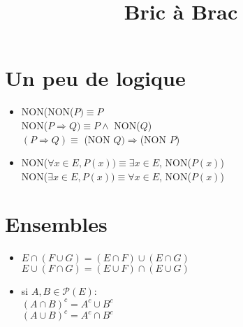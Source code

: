 \documentclass[fleqn]{article}
\title{Bric \`a Brac}
\date{}
\begin{document}
\maketitle

\section{Un peu de logique}
\begin{itemize}
	\item NON(NON(\(P) \equiv  P\) \\
		NON(\(P \Rightarrow Q) \equiv P \land\) NON(\(Q\)) \\
		\((P \Rightarrow Q) \equiv\) (NON \(Q)\Rightarrow\)(NON \(P\))
	\item NON(\(\forall x \in E, P(x)) \equiv \exists x \in E\), NON(\(P(x)\)) \\
		NON(\(\exists x \in E, P(x)) \equiv \forall x \in E\), NON(\(P(x)\))
\end{itemize}

\section{Ensembles}
\begin{itemize}
	\item \(E \cap(F \cup G) = (E \cap F) \cup (E \cap G)\) \\
		\(E \cup (F \cap G) = (E \cup F) \cap (E \cup G)\)
	\item si \(A, B \in \mathcal{P}(E)\): \\
		\((A \cap B)^c = A^c \cup B^c\) \\
		\((A \cup B)^c = A^c \cap B^c\)
\end{itemize}
\end{document}
